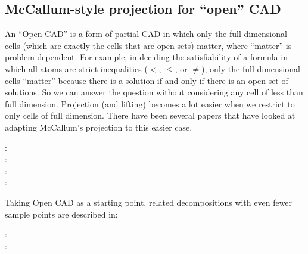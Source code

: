 \documentclass{article}
\begin{document}
\subsection{McCallum-style projection for ``open'' CAD}
An ``Open CAD'' is a form of partial CAD in which only the full
dimensional cells (which are exactly the cells that are open sets)
matter, where ``matter'' is problem dependent.  For example, in
deciding the satisfiability of a formula in which all atoms are strict
inequalities ($<$, $\leq$, or $\neq$), only the full dimensional cells
``matter'' because there is a solution if and only if there is an open set
of solutions.  So we can answer the question without considering any
cell of less than full dimension. 
Projection (and lifting) becomes a lot easier when we restrict to only
cells of full dimension.   There have been several papers that have
looked at adapting McCallum's projection to this easier case.
%
\begin{description}
\item[\autocite{McCallum:93} :]  
\item[\autocite{Strzebonski:94} :]  
\item[\autocite{Brown14} :]  
\item[\autocite{BarEtAl:2023} :]  
\end{description}
%

Taking Open CAD as a starting point, related decompositions 
with even fewer sample points are described in:
%
\begin{description}
\item[\autocite{Han:2014} :]  
\item[\autocite{Han:2016} :]  
\end{description}
%


\end{document}
